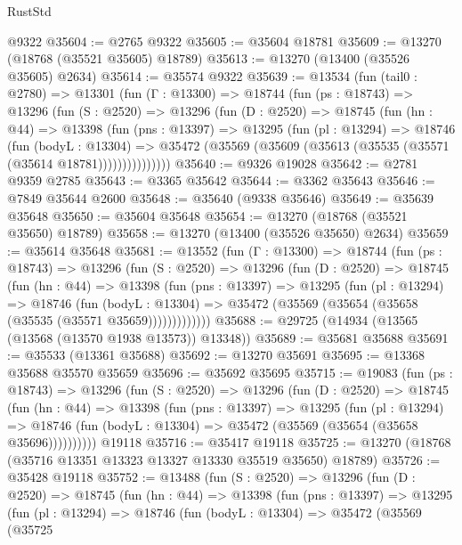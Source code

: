 \begin{lexlean}{RustStd}
\begin{coremodule}
    @9322
@35604 := @2765 @9322
@35605 := @35604 @18781
@35609 := @13270 (@18768 (@35521 @35605) @18789)
@35613 := @13270 (@13400 (@35526 @35605) @2634)
@35614 := @35574 @9322
@35639 := @13534
    (fun (tail0 : @2780) =>
    @13301
      (fun (Γ : @13300) =>
      @18744
        (fun (ps : @18743) =>
        @13296
          (fun (S : @2520) =>
          @13296
            (fun (D : @2520) =>
            @18745
              (fun (hn : @44) =>
              @13398
                (fun (pns : @13397) =>
                @13295
                  (fun (pl : @13294) =>
                  @18746
                    (fun (bodyL : @13304) =>
                    @35472 (@35569 (@35609 (@35613 (@35535 (@35571 (@35614 @18781)))))))))))))))
@35640 := @9326 @19028
@35642 := @2781 @9359 @2785
@35643 := @3365 @35642
@35644 := @3362 @35643
@35646 := @7849 @35644 @2600
@35648 := @35640 (@9338 @35646)
@35649 := @35639 @35648
@35650 := @35604 @35648
@35654 := @13270 (@18768 (@35521 @35650) @18789)
@35658 := @13270 (@13400 (@35526 @35650) @2634)
@35659 := @35614 @35648
@35681 := @13552
    (fun (Γ : @13300) =>
    @18744
      (fun (ps : @18743) =>
      @13296
        (fun (S : @2520) =>
        @13296
          (fun (D : @2520) =>
          @18745
            (fun (hn : @44) =>
            @13398
              (fun (pns : @13397) =>
              @13295
                (fun (pl : @13294) =>
                @18746
                  (fun (bodyL : @13304) =>
                  @35472 (@35569 (@35654 (@35658 (@35535 (@35571 @35659)))))))))))))
@35688 := @29725 (@14934 (@13565 (@13568 (@13570 @1938 @13573)) @13348))
@35689 := @35681 @35688
@35691 := @35533 (@13361 @35688)
@35692 := @13270 @35691
@35695 := @13368 @35688 @35570 @35659
@35696 := @35692 @35695
@35715 := @19083
    (fun (ps : @18743) =>
    @13296
      (fun (S : @2520) =>
      @13296
        (fun (D : @2520) =>
        @18745
          (fun (hn : @44) =>
          @13398
            (fun (pns : @13397) =>
            @13295
              (fun (pl : @13294) =>
              @18746 (fun (bodyL : @13304) => @35472 (@35569 (@35654 (@35658 @35696))))))))))
    @19118
@35716 := @35417 @19118
@35725 := @13270 (@18768 (@35716 @13351 @13323 @13327 @13330 @35519 @35650) @18789)
@35726 := @35428 @19118
@35752 := @13488
    (fun (S : @2520) =>
    @13296
      (fun (D : @2520) =>
      @18745
        (fun (hn : @44) =>
        @13398
          (fun (pns : @13397) =>
          @13295
            (fun (pl : @13294) =>
            @18746
              (fun (bodyL : @13304) =>
              @35472
                (@35569
                  (@35725

\end{coremodule}
\end{lexlean}

